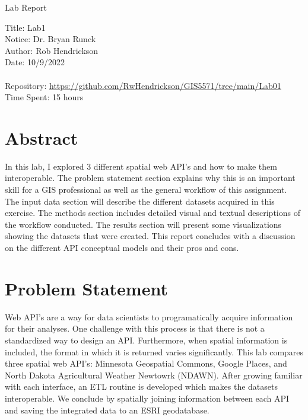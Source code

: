 \documentclass[article,12pt]{article}
\numberwithin{equation}{section}
\begin{document}
\begin{center}
Lab Report

Title: Lab1\\
Notice: Dr. Bryan Runck\\
Author: Rob Hendrickson\\
Date: 10/9/2022\\~\\

Repository: \url{https://github.com/RwHendrickson/GIS5571/tree/main/Lab01}\\
Time Spent: 15 hours

\end{center}

\section*{Abstract}
In this lab, I explored 3 different spatial web API's and how to make them interoperable. The problem statement section explains why this is an important skill for a GIS professional as well as the general workflow of this assignment. The input data section will describe the different datasets acquired in this exercise. The methods section includes detailed visual and textual descriptions of the workflow conducted. The results section will present some visualizations showing the datasets that were created. This report concludes with a discussion on the different API conceptual models and their pros and cons.


\section*{Problem Statement}
Web API's are a way for data scientists to programatically acquire information for their analyses. One challenge with this process is that there is not a standardized way to design an API. Furthermore, when spatial information is included, the format in which it is returned varies significantly. This lab compares three spatial web API's: Minnesota Geospatial Commons, Google Places, and North Dakota Agricultural Weather Newtowrk (NDAWN). After growing familiar with each interface, an ETL routine is developed which makes the datasets interoperable. We conclude by spatially joining information between each API and saving the integrated data to an ESRI geodatabase. 
\end{document}
